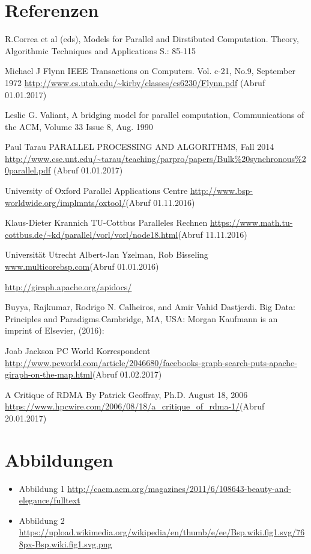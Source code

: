 \documentclass[a4paper,10pt]{scrartcl}
\begin{document}
\newpage
\section{Referenzen}
\begin{enumerate}[label={[\arabic*]}]


\item R.Correa et al (eds), Models for Parallel and Dirstibuted Computation. Theory, Algorithmic Techniques and Applications S.: 85-115

\item Michael J Flynn IEEE Transactions on Computers. Vol. c-21, No.9, September 1972 \url{http://www.cs.utah.edu/~kirby/classes/cs6230/Flynn.pdf} (Abruf 01.01.2017)

\item Leslie G. Valiant, A bridging model for parallel computation, Communications of the ACM, Volume 33 Issue 8, Aug. 1990 

\item Paul Tarau PARALLEL PROCESSING AND ALGORITHMS, Fall 2014
\url{http://www.cse.unt.edu/~tarau/teaching/parpro/papers/Bulk%20synchronous%20parallel.pdf} (Abruf 01.01.2017)
\item University of Oxford Parallel Applications Centre
\url{http://www.bsp-worldwide.org/implmnts/oxtool/}(Abruf 01.11.2016)
\item Klaus-Dieter Krannich TU-Cottbus Paralleles Rechnen
\url{https://www.math.tu-cottbus.de/~kd/parallel/vorl/vorl/node18.html}(Abruf 11.11.2016)
\item Universität Utrecht Albert-Jan Yzelman, Rob Bisseling
\url{www.multicorebsp.com}(Abruf 01.01.2016)
\item \url{http://giraph.apache.org/apidocs/}
\item Buyya, Rajkumar, Rodrigo N. Calheiros, and Amir Vahid Dastjerdi. Big Data: Principles and Paradigms.Cambridge, MA, USA: Morgan Kaufmann is an imprint of Elsevier, (2016):
\item Joab Jackson  PC World Korrespondent
\url{http://www.pcworld.com/article/2046680/facebooks-graph-search-puts-apache-giraph-on-the-map.html}(Abruf 01.02.2017)
\item A Critique of RDMA By Patrick Geoffray, Ph.D. August 18, 2006
\url{https://www.hpcwire.com/2006/08/18/a_critique_of_rdma-1/}(Abruf 20.01.2017)
\end{enumerate}
\section{Abbildungen}
\begin{itemize}
\item Abbildung 1 \url{http://cacm.acm.org/magazines/2011/6/108643-beauty-and-elegance/fulltext}
\item Abbildung 2 \url{https://upload.wikimedia.org/wikipedia/en/thumb/e/ee/Bsp.wiki.fig1.svg/768px-Bsp.wiki.fig1.svg.png}
       
\end{itemize}
\end{document}
